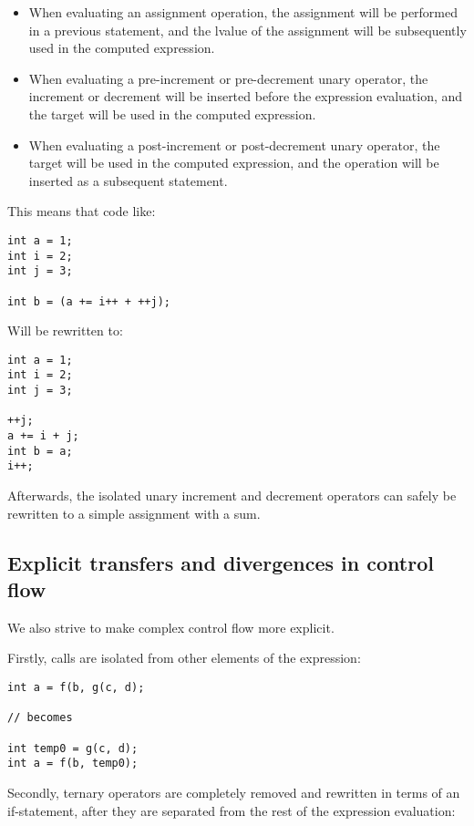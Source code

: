 \begin{itemize}
    \item When evaluating an assignment operation, the assignment will be performed in a previous statement, and the lvalue of the assignment will be subsequently used in the computed expression.
    \item When evaluating a pre-increment or pre-decrement unary operator, the increment or decrement will be inserted before the expression evaluation, and the target will be used in the computed expression.
    \item When evaluating a post-increment or post-decrement unary operator, the target will be used in the computed expression, and the operation will be inserted as a subsequent statement.
\end{itemize}

This means that code like:

\begin{lstlisting}
int a = 1;
int i = 2;
int j = 3;

int b = (a += i++ + ++j);
\end{lstlisting}

Will be rewritten to:

\begin{lstlisting}
int a = 1;
int i = 2;
int j = 3;

++j;
a += i + j;
int b = a;
i++;
\end{lstlisting}

Afterwards, the isolated unary increment and decrement operators can safely be rewritten to a simple assignment with a sum.

\subsection{Explicit transfers and divergences in control flow}

We also strive to make complex control flow more explicit. 

Firstly, calls are isolated from other elements of the expression:

\begin{lstlisting}
int a = f(b, g(c, d);

// becomes

int temp0 = g(c, d);
int a = f(b, temp0);
\end{lstlisting}

Secondly, ternary operators are completely removed and rewritten in terms of an if-statement, after they are separated from the rest of the expression evaluation:

